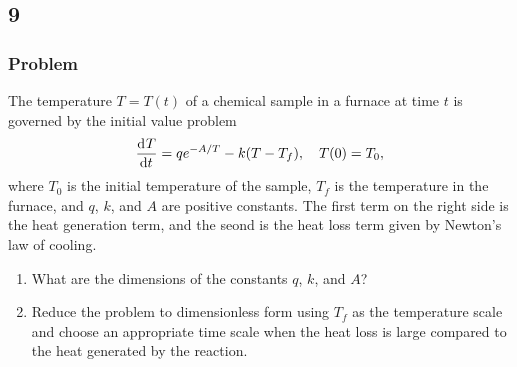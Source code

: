 \documentclass[12pt]{article}
\begin{document}
\newpage
\subsection{9}
\subsubsection*{Problem}

The temperature $T=T(t)$ of a chemical sample in a furnace at time $t$ is
governed by the initial value problem
$$\frac{\mathrm{d}^{} {T}}{\mathrm{d}{t}^{}}=qe^{-A/T}-k(T-T_f),\quad T(0)=T_0,$$ where $T_0$ is the initial
temperature of the sample, $T_f$ is the temperature in the furnace, and $q$,
$k$, and $A$ are positive constants. The first term on the right side is the
heat generation term, and the seond is the heat loss term given by Newton's law
of cooling.
\begin{enumerate}
\item What are the dimensions of the constants $q$, $k$, and $A$?
\item Reduce the problem to dimensionless form using $T_f$ as the temperature
  scale and choose an appropriate time scale when the heat loss is large
  compared to the heat generated by the reaction.
\end{enumerate}
\end{document}
